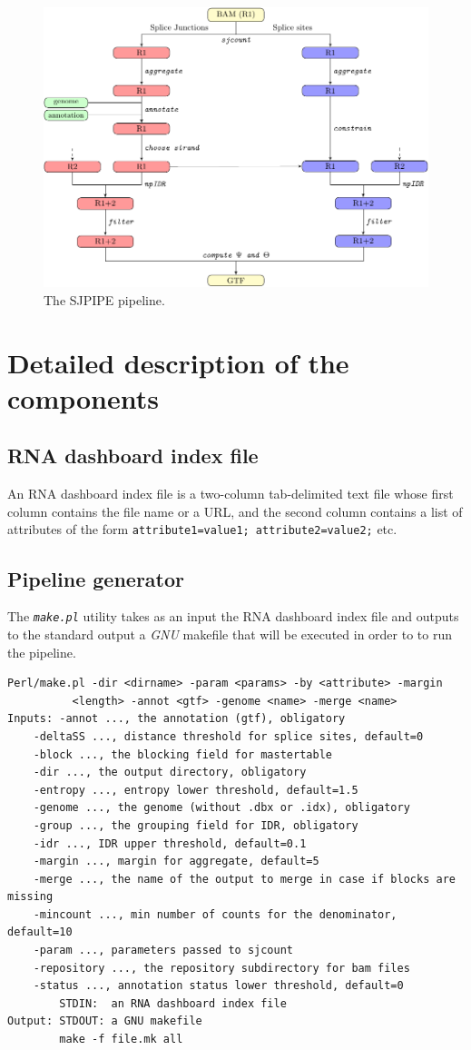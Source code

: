 \documentclass{article}
\newcommand{\prog}[1]{{\tt\em #1}}
\begin{document}
\begin{figure}
\centering
\includegraphics[width=\textwidth]{fig1_crop.pdf}
\caption{The SJPIPE pipeline.\label{fig::sjpipe}}
\end{figure}


\section{Detailed description of the components}
\subsection{RNA dashboard index file}
An RNA dashboard index file is a two-column tab-delimited text file whose first column contains the file name or a URL, and the second column contains a list of attributes of the form
{\tt attribute1=value1; attribute2=value2;} etc. 

\subsection{Pipeline generator}
The \prog{make.pl} utility takes as an input the RNA dashboard index file and outputs to the standard output a {\em GNU} makefile that 
will be executed in order to to run the pipeline.
\begin{verbatim} 
Perl/make.pl -dir <dirname> -param <params> -by <attribute> -margin 
          <length> -annot <gtf> -genome <name> -merge <name>
Inputs: -annot ..., the annotation (gtf), obligatory
	-deltaSS ..., distance threshold for splice sites, default=0
	-block ..., the blocking field for mastertable
	-dir ..., the output directory, obligatory
	-entropy ..., entropy lower threshold, default=1.5
	-genome ..., the genome (without .dbx or .idx), obligatory
	-group ..., the grouping field for IDR, obligatory
	-idr ..., IDR upper threshold, default=0.1
	-margin ..., margin for aggregate, default=5
	-merge ..., the name of the output to merge in case if blocks are missing
	-mincount ..., min number of counts for the denominator, default=10
	-param ..., parameters passed to sjcount
	-repository ..., the repository subdirectory for bam files
	-status ..., annotation status lower threshold, default=0
        STDIN:  an RNA dashboard index file 
Output: STDOUT: a GNU makefile
        make -f file.mk all
\end{verbatim} 
\end{document}
